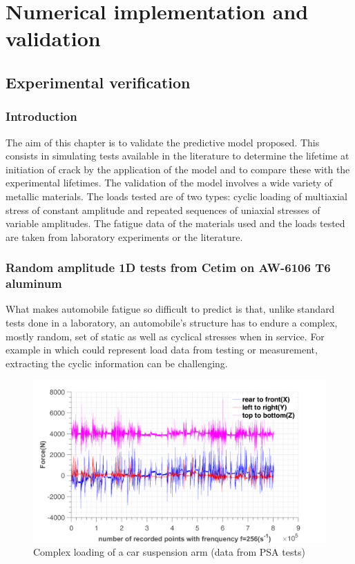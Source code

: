 \chapter{Numerical implementation and validation}\label{chp:6}
\minitoc
\section{Experimental verification}

\subsection{Introduction}
The aim of this chapter is to validate the predictive model proposed. This consists in simulating tests available in the literature to determine the lifetime at initiation of crack by the application of the model and to compare these with the experimental lifetimes. The validation of the model involves a wide variety of metallic materials. The loads tested are of two types: cyclic loading of multiaxial stress of constant amplitude and repeated sequences of uniaxial stresses of variable amplitudes. The fatigue data of the materials used and the loads tested are taken from laboratory experiments or the literature.

\subsection{Random amplitude 1D tests from Cetim on AW-6106 T6 aluminum}

What makes automobile fatigue so difficult to predict is that, unlike standard tests done in a laboratory, an automobile's structure has to endure a complex, mostly random, set of static as well as cyclical stresses when in service. For example in  which could represent load data from testing or measurement, extracting the cyclic information can be challenging. 
\begin{figure}[!h]
	\centering
	\includegraphics[width=\textwidth]{figures//xyz_suspension.png} 
	\caption{Complex loading of a car suspension arm (data from PSA tests)}
	\label{complexloading}
\end{figure}

